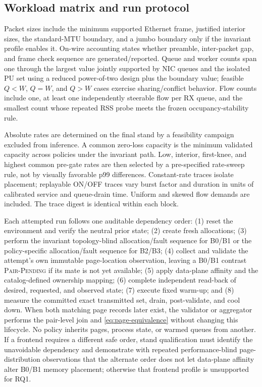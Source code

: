 \subsection{Workload matrix and run protocol}

Packet sizes include the minimum supported Ethernet frame, justified interior sizes, the standard-MTU boundary, and a jumbo boundary only if the invariant profile enables it. On-wire accounting states whether preamble, inter-packet gap, and frame check sequence are generated/reported. Queue and worker counts span one through the largest value jointly supported by NIC queues and the isolated PU set using a reduced power-of-two design plus the boundary value; feasible $Q<W$, $Q=W$, and $Q>W$ cases exercise sharing/conflict behavior. Flow counts include one, at least one independently steerable flow per RX queue, and the smallest count whose repeated RSS probe meets the frozen occupancy-stability rule.

Absolute rates are determined on the final stand by a feasibility campaign excluded from inference. A common zero-loss capacity is the minimum validated capacity across policies under the invariant path. Low, interior, first-knee, and highest common pre-gate rates are then selected by a pre-specified rate-sweep rule, not by visually favorable p99 differences. Constant-rate traces isolate placement; replayable ON/OFF traces vary burst factor and duration in units of calibrated service and queue-drain time. Uniform and skewed flow demands are included. The trace digest is identical within each block.

Each attempted run follows one auditable dependency order: (1) reset the environment and verify the neutral prior state; (2) create fresh allocations; (3) perform the invariant topology-blind allocation/fault sequence for B0/B1 or the policy-specific allocation/fault sequence for B2/B3; (4) collect and validate the attempt's own immutable page-location observation, leaving a B0/B1 contrast \textsc{Pair-Pending} if its mate is not yet available; (5) apply data-plane affinity and the catalog-defined ownership mapping; (6) complete independent read-back of desired, requested, and observed state; (7) execute fixed warm-up; and (8) measure the committed exact transmitted set, drain, post-validate, and cool down. When both matching page records later exist, the validator or aggregator performs the pair-level join and \cref{eq:page-equivalence} without changing this lifecycle. No policy inherits pages, process state, or warmed queues from another. If a frontend requires a different safe order, stand qualification must identify the unavoidable dependency and demonstrate with repeated performance-blind page-distribution observations that the alternate order does not let data-plane affinity alter B0/B1 memory placement; otherwise that frontend profile is unsupported for RQ1.

